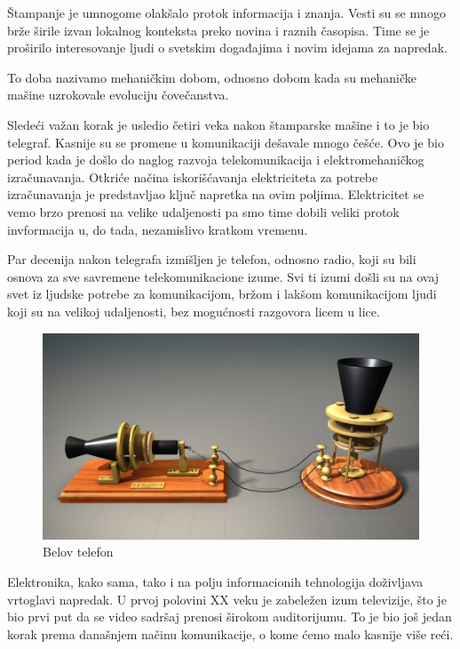 \documentclass[10pt]{article}
\begin{document}
	Štampanje je umnogome olakšalo protok informacija i znanja. Vesti su se mnogo brže širile izvan lokalnog konteksta preko novina i raznih časopisa. Time se je proširilo interesovanje ljudi o svetskim događajima i novim idejama za napredak.

	To doba nazivamo mehaničkim dobom, odnosno dobom kada su mehaničke mašine uzrokovale evoluciju čovečanstva.

	Sledeći važan korak je usledio četiri veka nakon štamparske mašine i to je bio telegraf. Kasnije su se promene u komunikaciji dešavale mnogo češće. Ovo je bio period kada je došlo do naglog razvoja telekomunikacija i elektromehaničkog izračunavanja. Otkriće načina iskorišćavanja elektriciteta za potrebe izračunavanja je predstavljao ključ napretka na ovim poljima. Elektricitet se vemo brzo prenosi na velike udaljenosti pa smo time dobili veliki protok invformacija u, do tada, nezamislivo kratkom vremenu.
	
	Par decenija nakon telegrafa izmišljen je telefon, odnosno radio, koji  su bili osnova za sve savremene telekomunikacione izume. Svi ti izumi došli su na ovaj svet iz ljudske potrebe za komunikacijom, bržom i lakšom komunikacijom ljudi koji su na velikoj udaljenosti, bez mogućnosti razgovora licem u lice. 

	
\begin{figure}
    \centering
    \includegraphics[scale=0.4]{telefon.jpg}
    \caption{Belov telefon}
\end{figure}

	Elektronika, kako sama, tako i na polju informacionih tehnologija doživljava vrtoglavi napredak. U prvoj polovini XX veku je zabeležen izum televizije, što je bio prvi put da se video sadršaj prenosi širokom auditorijumu. To je bio još jedan korak prema današnjem načinu komunikacije, o kome ćemo malo kasnije više reći.
	
\end{document}
